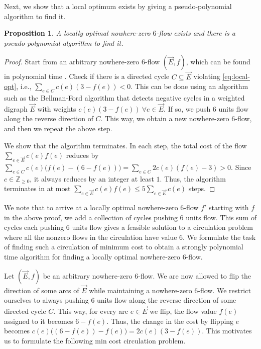 \documentclass[11pt]{article}
\newtheorem{prop}[theorem]{Proposition}
\newcommand{\Z}{\mathbb{Z}}
\begin{document}
Next, we show that a local optimum exists by giving a pseudo-polynomial algorithm to find it. 
\begin{prop}
\label{prop:local}
    A locally optimal nowhere-zero $6$-flow exists and there is a pseudo-polynomial algorithm to find it.
\end{prop}
\begin{proof}
    Start from an arbitrary nowhere-zero $6$-flow $(\vec{E},f)$, which can be found in polynomial time \cite{younger1983integer}. Check if there is a directed cycle $C\subseteq \vec{E}$ violating \eqref{eq:local-opt}, i.e., $\sum_{e\in C} c(e)(3-f(e))<0$. This can be done using an algorithm such as the Bellman-Ford algorithm that detects negative cycles in a weighted digraph $\vec{E}$ with weights $c(e)(3-f(e))\ \forall e\in\vec{E}$. If so, we push $6$ units flow along the reverse direction of $C$. This way, we obtain a new nowhere-zero $6$-flow, and then we repeat the above step.

    We show that the algorithm terminates. In each step, the total cost of the flow $\sum_{e\in \vec{E}}c(e)f(e)$ reduces by $\sum_{e\in C} c(e)\big(f(e)-(6-f(e))\big)=\sum_{e\in C} 2c(e)(f(e)-3)>0$. Since $c\in\Z_{\geq 0}$, it always reduces by an integer at least $1$. Thus, the algorithm terminates in at most $\sum_{e\in \vec{E}}c(e)f(e)\leq 5\sum_{e\in \vec{E}}c(e)$ steps.
\end{proof}

We note that to arrive at a locally optimal nowhere-zero 6-flow $f'$ starting with $f$ in the above proof, we add a collection of cycles pushing $6$ units flow. This sum of cycles each pushing $6$ units flow gives a feasible solution to a circulation problem where all the nonzero flows in the circulation have value $6$. We formulate the task of finding such a circulation of minimum cost to obtain a strongly polynomial time algorithm for finding a locally optimal nowhere-zero $6$-flow.

Let $(\vec{E},f)$ be an arbitrary nowhere-zero $6$-flow. We are now allowed to flip the direction of some arcs of $\vec{E}$ while maintaining a nowhere-zero $6$-flow. We restrict ourselves to always pushing $6$ units flow along the reverse direction of some directed cycle $C$. This way, for every arc $e\in \vec{E}$ we flip, the flow value $f(e)$ assigned to it becomes $6-f(e)$. Thus, the change in the cost by flipping $e$ becomes $c(e)\big((6-f(e))-f(e)\big)=2c(e)
(3-f(e))$. This motivates us to formulate the following min cost circulation problem.
\end{document}
